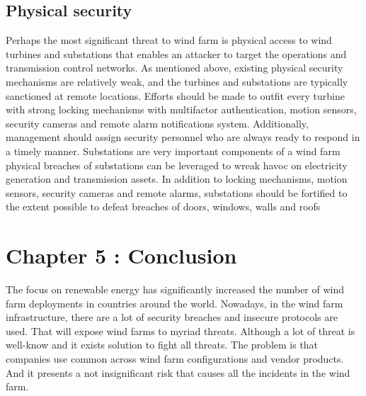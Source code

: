 \documentclass[twosided,a4,10pt]{article}
\begin{document}
\begin{multicols}{2}
\subsection{Physical security} 
Perhaps the most significant threat to wind farm is physical access to wind turbines and substations that enables an attacker to target the operations and transmission control networks. As mentioned above, existing physical security mechanisms are relatively weak, and the turbines and substations are typically sanctioned at remote locations. Efforts should be made to outfit every turbine with strong locking mechanisms with multifactor authentication, motion sensors, security cameras and remote alarm notifications system. Additionally, management should assign security personnel who are always ready to respond in a timely manner. Substations are very important components of a wind farm physical breaches of substations can be leveraged to wreak havoc on electricity generation and transmission assets. In addition to locking mechanisms, motion sensors, security cameras and remote alarms, substations should be fortified to the extent possible to defeat breaches of doors, windows, walls and roofs

\section{Chapter 5 : Conclusion }
The focus on renewable energy has significantly increased the number of wind farm deployments in countries around the world. Nowadays, in the wind farm infrastructure, there are a lot of security breaches and insecure protocols are used. That will expose wind farms to myriad threats. Although a lot of threat is well-know and it exists solution to fight all threats. The problem is that companies use common across wind farm configurations and vendor products. And it presents a not insignificant risk that causes all the incidents in the wind farm.







\end{multicols}
\end{document}
